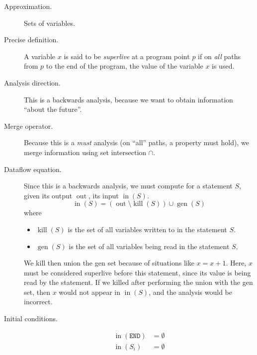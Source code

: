 \documentclass[11pt,letterpaper]{article}
\DeclareMathOperator{\inputOp}{in}
\DeclareMathOperator{\outputOp}{out}
\DeclareMathOperator{\killOp}{kill}
\DeclareMathOperator{\genOp}{gen}
\newcommand{\In}[1]{\inputOp{(#1)}}
\newcommand{\Out}[1]{\outputOp}{(#1)}
\newcommand{\Kill}[1]{\killOp{(#1)}}
\newcommand{\Gen}[1]{\genOp{(#1)}}
\begin{document}
\begin{description}
    \item[Approximation.] Sets of variables.

    \item[Precise definition.]
        A variable $x$ is said to be \emph{superlive} at a program point $p$ if
        on \emph{all} paths from $p$ to the end of the program, the value of
        the variable $x$ is used.

    \item[Analysis direction.]
        This is a backwards analysis, because we want to obtain information
        ``about the future''.

    \item[Merge operator.]
        Because this is a \emph{must} analysis (on ``all'' paths, a property
        must hold), we merge information using set intersection $\cap$.

    \item[Dataflow equation.]
        Since this is a backwards analysis, we must compute for a statement
        $S$, given its output $\Out{S}$, its input $\In{S}$.
        \begin{equation*}
            \In{S} = \left(\Out{S} \setminus \Kill{S}\right) \cup \Gen{S}
        \end{equation*}
        where
        \begin{itemize}
            \item $\Kill{S}$ is the set of all variables written to in the
                statement $S$.

            \item $\Gen{S}$ is the set of all variables being read in the
                statement $S$.
        \end{itemize}

        We kill then union the gen set because of situations like $x = x + 1$.
        Here, $x$ must be considered superlive before this statement, since its
        value is being read by the statement. If we killed after performing the
        union with the gen set, then $x$ would not appear in $\In{S}$, and the
        analysis would be incorrect.

    \item[Initial conditions.]
        \begin{align*}
            \In{\mathtt{END}} &= \emptyset \\
            \In{S_i} &= \emptyset
        \end{align*}
\end{description}
\end{document}
